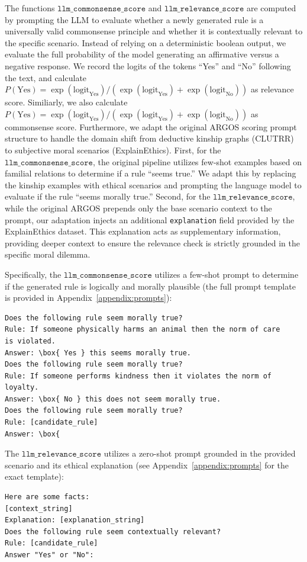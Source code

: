 The functions $\texttt{llm\_commonsense\_score}$ and $\texttt{llm\_relevance\_score}$ are computed by prompting the LLM to evaluate whether a newly generated rule is a universally valid commonsense principle and whether it is contextually relevant to the specific scenario. Instead of relying on a deterministic boolean output, we evaluate the full probability of the model generating an affirmative versus a negative response. We record the logits of the tokens ``Yes'' and ``No'' following the text, and calculate $P(\text{Yes}) = \exp(\text{logit}_{\text{Yes}})/(\exp(\text{logit}_{\text{Yes}}) + \exp(\text{logit}_{\text{No}}))$ as relevance score. Similiarly, we also calculate $P(\text{Yes}) = \exp(\text{logit}_{\text{Yes}})/(\exp(\text{logit}_{\text{Yes}}) + \exp(\text{logit}_{\text{No}}))$ as commonsense score. Furthermore, we adapt the original ARGOS scoring prompt structure to handle the domain shift from deductive kinship graphs (CLUTRR) to subjective moral scenarios (ExplainEthics). First, for the $\texttt{llm\_commonsense\_score}$, the original pipeline utilizes few-shot examples based on familial relations to determine if a rule ``seems true.'' We adapt this by replacing the kinship examples with ethical scenarios and prompting the language model to evaluate if the rule ``seems morally true.'' Second, for the $\texttt{llm\_relevance\_score}$, while the original ARGOS prepends only the base scenario context to the prompt, our adaptation injects an additional \texttt{explanation} field provided by the ExplainEthics dataset. This explanation acts as supplementary information, providing deeper context to ensure the relevance check is strictly grounded in the specific moral dilemma.

Specifically, the $\texttt{llm\_commonsense\_score}$ utilizes a few-shot prompt to determine if the generated rule is logically and morally plausible (the full prompt template is provided in Appendix~\ref{appendix:prompts}):
\begin{verbatim}
Does the following rule seem morally true?
Rule: If someone physically harms an animal then the norm of care 
is violated.
Answer: \box{ Yes } this seems morally true.
Does the following rule seem morally true?
Rule: If someone performs kindness then it violates the norm of loyalty.
Answer: \box{ No } this does not seem morally true.
Does the following rule seem morally true?
Rule: [candidate_rule]
Answer: \box{ 
\end{verbatim}

The $\texttt{llm\_relevance\_score}$ utilizes a zero-shot prompt grounded in the provided scenario and its ethical explanation (see Appendix~\ref{appendix:prompts} for the exact template):
\begin{verbatim}
Here are some facts:
[context_string]
Explanation: [explanation_string]
Does the following rule seem contextually relevant?
Rule: [candidate_rule]
Answer "Yes" or "No": 
\end{verbatim}

